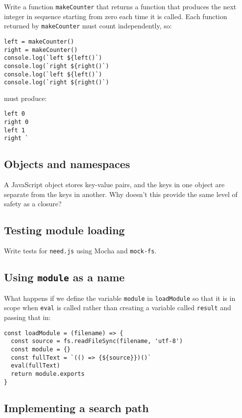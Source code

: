 \documentclass[krantzl]{krantz}
\begin{document}
Write a function \texttt{makeCounter} that returns a function
that produces the next integer in sequence starting from zero each time it is called.
Each function returned by \texttt{makeCounter} must count independently, so:

\begin{lstlisting}[frame=tblr]
left = makeCounter()
right = makeCounter()
console.log(`left ${left()`)
console.log(`right ${right()`)
console.log(`left ${left()`)
console.log(`right ${right()`)
\end{lstlisting}


\noindent must produce:

\begin{lstlisting}[frame=tblr]
left 0
right 0
left 1
right `
\end{lstlisting}

\subsection*{Objects and namespaces}


A JavaScript object stores key-value pairs,
and the keys in one object are separate from the keys in another.
Why doesn’t this provide the same level of safety as a closure?

\subsection*{Testing module loading}


Write tests for \texttt{need.js} using Mocha and \texttt{mock-fs}.

\subsection*{Using \texttt{module} as a name}


What happens if we define the variable \texttt{module} in \texttt{loadModule}
so that it is in scope when \texttt{eval} is called
rather than creating a variable called \texttt{result} and passing that in:

\begin{lstlisting}[frame=tblr]
const loadModule = (filename) => {
  const source = fs.readFileSync(filename, 'utf-8')
  const module = {}
  const fullText = `(() => {${source}})()`
  eval(fullText)
  return module.exports
}
\end{lstlisting}

\subsection*{Implementing a search path}
\end{document}
